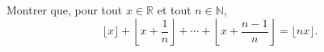 Montrer que, pour tout $x \in \mathbb{R}$ et tout $n \in \mathbb{N}$,
\[ \lfloor x \rfloor + \left\lfloor x + \frac{1}{n} \right\rfloor + \cdots + \left\lfloor x + \frac{n - 1}{n} \right\rfloor = \lfloor nx \rfloor. \]
